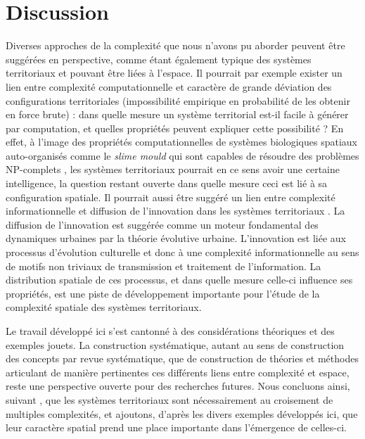 \documentclass[11pt]{article}
\begin{document}
\section{Discussion}



Diverses approches de la complexité que nous n'avons pu aborder peuvent être suggérées en perspective, comme étant également typique des systèmes territoriaux et pouvant être liées à l'espace. Il pourrait par exemple exister un lien entre complexité computationnelle et caractère de grande déviation des configurations territoriales (impossibilité empirique en probabilité de les obtenir en force brute) : dans quelle mesure un système territorial est-il facile à générer par computation, et quelles propriétés peuvent expliquer cette possibilité ? En effet, à l'image des propriétés computationnelles de systèmes biologiques spatiaux auto-organisés comme le \emph{slime mould} qui sont capables de résoudre des problèmes NP-complets \citep{zhu2013amoeba}, les systèmes territoriaux pourrait en ce sens avoir une certaine intelligence, la question restant ouverte dans quelle mesure ceci est lié à sa configuration spatiale. Il pourrait aussi être suggéré un lien entre complexité informationnelle et diffusion de l'innovation dans les systèmes territoriaux \citep{favaro2011gibrat}. La diffusion de l'innovation est suggérée comme un moteur fondamental des dynamiques urbaines par la théorie évolutive urbaine. L'innovation est liée aux processus d'évolution culturelle \citep{Mesoudi25072017} et donc à une complexité informationnelle au sens de motifs non triviaux de transmission et traitement de l'information. La distribution spatiale de ces processus, et dans quelle mesure celle-ci influence ses propriétés, est une piste de développement importante pour l'étude de la complexité spatiale des systèmes territoriaux.


Le travail développé ici s'est cantonné à des considérations théoriques et des exemples jouets. La construction systématique, autant au sens de construction des concepts par revue systématique, que de construction de théories et méthodes articulant de manière pertinentes ces différents liens entre complexité et espace, reste une perspective ouverte pour des recherches futures. Nous concluons ainsi, suivant \cite{raimbault2017complexity}, que les systèmes territoriaux sont nécessairement au croisement de multiples complexités, et ajoutons, d'après les divers exemples développés ici, que leur caractère spatial prend une place importante dans l'émergence de celles-ci.
\end{document}
